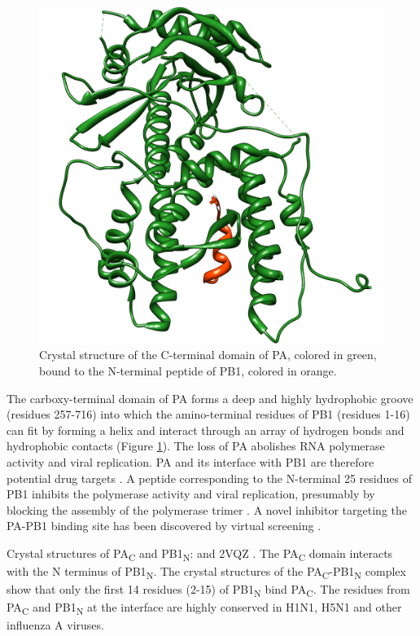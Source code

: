 \begin{figure}
\centering
\includegraphics[width=\linewidth]{../influenza/2ZNL.png}
\caption{Crystal structure of the C-terminal domain of PA, colored in green, bound to the N-terminal peptide of PB1, colored in orange.}
\label{influenza:2ZNL}
\end{figure}

The carboxy-terminal domain of PA forms a deep and highly hydrophobic groove (residues 257-716) into which the amino-terminal residues of PB1 (residues 1-16) can fit by forming a helix and interact through an array of hydrogen bonds and hydrophobic contacts \citep{1141} (Figure \ref{influenza:2ZNL}). The loss of PA abolishes RNA polymerase activity and viral replication. PA and its interface with PB1 are therefore potential drug targets \citep{1141}. A peptide corresponding to the N-terminal 25 residues of PB1 inhibits the polymerase activity and viral replication, presumably by blocking the assembly of the polymerase trimer \citep{1234}. A novel inhibitor targeting the PA-PB1 binding site has been discovered by virtual screening \citep{1235}.

Crystal structures of PA\textsubscript{C} and PB1\textsubscript{N}: \citep{1540} and 2VQZ \citep{1141}. The PA\textsubscript{C} domain interacts with the N terminus of PB1\textsubscript{N}. The crystal structures of the PA\textsubscript{C}-PB1\textsubscript{N} complex show that only the first 14 residues (2-15) of PB1\textsubscript{N} bind PA\textsubscript{C}. The residues from PA\textsubscript{C} and PB1\textsubscript{N} at the interface are highly conserved in H1N1, H5N1 and other influenza A viruses.


